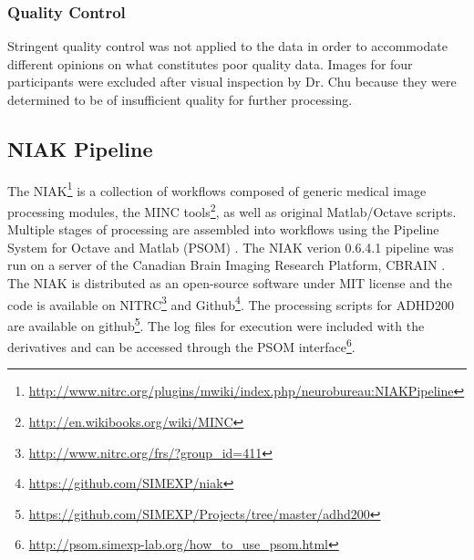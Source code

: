 \documentclass[preprint,12pt,3p]{elsarticle}
\begin{document}
\subsubsection{Quality Control}
Stringent quality control was not applied to the data in order to accommodate different opinions on what constitutes poor quality data. Images for four participants were excluded after visual inspection by Dr. Chu because they were determined to be of insufficient quality for further processing.

\subsection{NIAK Pipeline}
The NIAK\footnote{\url{http://www.nitrc.org/plugins/mwiki/index.php/neurobureau:NIAKPipeline}} is a collection of workflows composed of generic medical image processing modules, the MINC tools\footnote{\url{http://en.wikibooks.org/wiki/MINC}}, as well as original Matlab/Octave scripts. Multiple stages of processing are assembled into workflows using the Pipeline System for Octave and Matlab (PSOM) \cite{Bellec2012}. The NIAK verion 0.6.4.1 pipeline was run on a server of the Canadian Brain Imaging Research Platform, CBRAIN \cite{sherif2014cbrain}. The NIAK is distributed as an open-source software under MIT license and the code is available on NITRC\footnote{\url{http://www.nitrc.org/frs/?group_id=411}} and Github\footnote{\url{https://github.com/SIMEXP/niak}}. The processing scripts for ADHD200 are available on github\footnote{\url{https://github.com/SIMEXP/Projects/tree/master/adhd200}}. The log files for execution were included with the derivatives and can be accessed through the PSOM interface\footnote{\url{http://psom.simexp-lab.org/how_to_use_psom.html}}.
\end{document}
